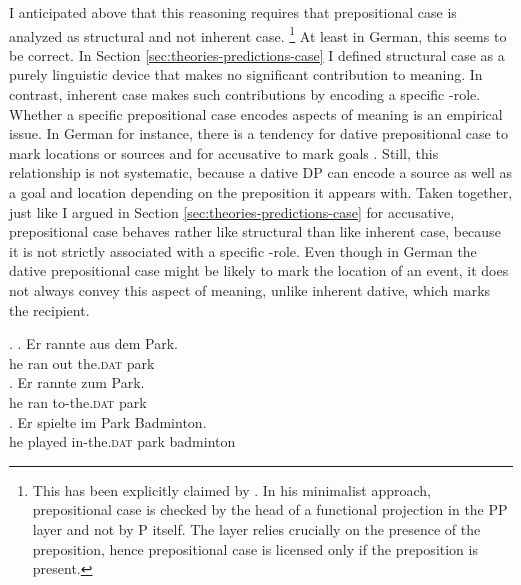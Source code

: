 I anticipated above that this reasoning requires that prepositional case is analyzed as structural and not inherent case.%
% 
\footnote{
This has been explicitly claimed by \citet[24]{dendikken2013}. In his minimalist approach, prepositional case is checked by the head of a functional projection in the PP layer and not by P itself. The layer relies crucially on the presence of the preposition, hence prepositional case is licensed only if the preposition is present.}\afterfn%
%
At least in German, this seems to be correct. In Section \ref{sec:theories-predictions-case} I defined structural case as a purely linguistic device that makes no significant contribution to meaning. In contrast, inherent case makes such contributions by encoding a specific \texttheta-role. Whether a specific prepositional case encodes aspects of meaning is an empirical issue. In German for instance, there is a tendency for dative prepositional case to mark locations or sources and for accusative to mark goals \citep[8]{zwarts2005}. Still, this relationship is not systematic, because a dative DP can encode a source \Next[a] as well as a goal \Next[b] and location \Next[c] depending on the preposition it appears with. Taken together, just like I argued in Section \ref{sec:theories-predictions-case} for accusative, prepositional case behaves rather like structural than like inherent case, because it is not strictly associated with a specific \texttheta-role. Even though in German the dative prepositional case might be likely to mark the location of an event, it does not always convey this aspect of meaning, unlike inherent dative, which marks the recipient.

\ex. \ag. Er rannte aus dem Park.\\
he ran  out the.\textsc{dat} park\\
  
\bg. Er rannte zum Park.\\
he ran to-the.\textsc{dat} park\\
 
\cg. Er spielte im Park Badminton.\\
he played in-the.\textsc{dat} park badminton\\

